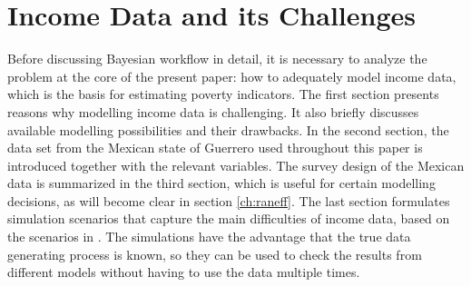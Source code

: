 \chapter{Income Data and its Challenges}

Before discussing Bayesian workflow in detail, it is necessary to analyze the problem at the core of the present paper: how to adequately model income data, which is the basis for estimating poverty indicators.
The first section presents reasons why modelling income data is challenging.
It also briefly discusses available modelling possibilities and their drawbacks.
In the second section, the data set from the Mexican state of Guerrero used throughout this paper is introduced together with the relevant variables.
The survey design of the Mexican data is summarized in the third section, which is useful for certain modelling decisions, as will become clear in section \ref{ch:raneff}.
The last section formulates simulation scenarios that capture the main difficulties of income data, based on the scenarios in \cite{rojas_perilla_data_2020}.
The simulations have the advantage that the true data generating process is known, so they can be used to check the results from different models without having to use the data multiple times.







